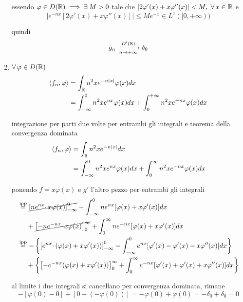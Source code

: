 \begin{enumerate}
essendo $\varphi \in D(\RR ) \implies \exists M >0$ tale che $| 2\varphi '( x) +x\varphi ''( x)| < M,\ \forall x\in \RR $ e\begin{equation*}
\left| e^{-nx}[ 2\varphi '( x) +x\varphi ''( x)]\right| \leqslant Me^{-x} \in L^{1}([ 0,+\infty ))
\end{equation*}

quindi\begin{equation*}
g_{n}\xrightarrow[n\rightarrow +\infty ]{D'(\mathbb{R} )} \delta _{0}
\end{equation*}
\item $\forall \varphi \in D(\RR )$\begin{equation*}
\begin{aligned}
\langle f_{n} ,\varphi \rangle  & =\int _{\mathbb{R} } n^{2} xe^{-n| x| } \varphi ( x) dx\\
 & =\int ^{0}_{-\infty } n^{2} xe^{nx} \varphi ( x) dx+\int ^{+\infty }_{0} n^{2} xe^{-nx} \varphi ( x) dx
\end{aligned}
\end{equation*}

integrazione per parti due volte per entrambi gli integrali e teorema della convergenza dominata\begin{align*}
\langle f_{n} ,\varphi \rangle  & =\int _{\mathbb{R} } n^{2} xe^{-n| x| } dx\\
 & =\int ^{0}_{-\infty } n^{2} xe^{nx} \varphi ( x) dx+\int ^{\infty }_{0} n^{2} xe^{-nx} \varphi ( x) dx
\end{align*}

ponendo $f=x\varphi ( x)$ e $g'$ l'altro pezzo per entrambi gli integrali\begin{align*}
 & \overset{\text{ipp}}{=}\cancel{\left[ ne^{nx} \cdotp x\varphi ( x)\right]^{0}_{-\infty }} -\int ^{0}_{-\infty } ne^{nx}[ \varphi ( x) +x\varphi '( x)] dx\\
 & \ \ \ \ +\cancel{\left[ -ne^{-nx} \cdotp x\varphi ( x)\right]^{\infty }_{0}} +\int ^{\infty }_{0} ne^{-nx}[ \varphi ( x) +x\varphi '( x)] dx\\
 & \overset{\text{ipp}}{=} -\left\{\left[ e^{nx} \cdotp ( \varphi ( x) +x\varphi '( x))\right]^{0}_{-\infty } -\int ^{0}_{-\infty } e^{nx}[ \varphi '( x) -\varphi '( x) -x\varphi ''( x)] dx\right\}\\
 & \ \ \ \ +\left\{\left[ -e^{-nx}( \varphi ( x) +x\varphi '( x))\right]^{\infty }_{0} +\int ^{\infty }_{0} e^{-nx}[ \varphi '( x) +\varphi '( x) +x\varphi ''( x)] dx\right\}
\end{align*}

al limite i due integrali si cancellano per convergenza dominata, rimane\begin{equation*}
-[ \varphi ( 0) -0] +[ 0-( -\varphi ( 0))] =-\varphi ( 0) +\varphi ( 0) =-\delta _{0} +\delta _{0} =0
\end{equation*}
\end{enumerate}
